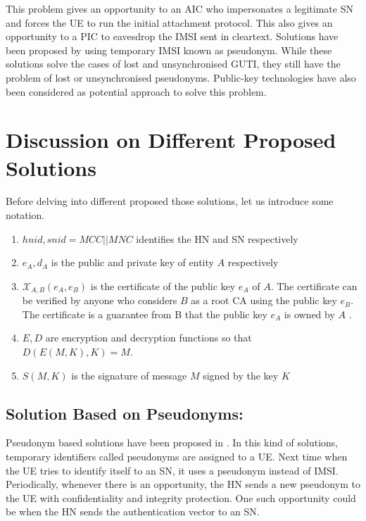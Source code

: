 \documentclass{river-journal}
\begin{document}
This problem gives an opportunity to an AIC who impersonates a legitimate SN and forces the UE to run the initial attachment protocol. This also gives an opportunity to a PIC to eavesdrop the IMSI sent in cleartext. Solutions \cite{pseudonym_valtteri_philip,pseudonym_ericsson,CCS15,SSR15} have been proposed by using temporary IMSI known as pseudonym. While these solutions solve the cases of lost and unsynchronised GUTI, they still have the problem of lost or unsynchronised pseudonyms. Public-key technologies have also been considered as potential approach to solve this problem.

\section{Discussion on Different Proposed Solutions}\label{sec:solutions} 
\label{sec:existing_solutions}
Before delving into different proposed those solutions, let us introduce some notation. 
\begin{enumerate}
\item $hnid,snid=MCC||MNC$ identifies the HN and SN respectively
\item $e_A,d_A$ is the public and private key of entity $A$ respectively
\item $\mathcal{X}_{A,B}(e_A,e_B)$ is the certificate of the public key $e_A$ of $A$. The certificate can be verified by anyone who considers $B$ as a root CA using the public key $e_B$. The certificate is a guarantee from B that the public key $e_A$ is owned by $A$ .
\item $E,D$ are encryption and decryption functions so that $D(E(M,K),K) = M$.
\item $S(M,K)$ is the signature of message $M$ signed by the key $K$
\end{enumerate}

\subsection{Solution Based on Pseudonyms:}
\label{sec:pseudonyms}
Pseudonym based solutions have been proposed in \cite{pseudonym_ericsson,pseudonym_valtteri_philip,CCS15,SSR15}. In this kind of solutions, temporary identifiers called pseudonyms are assigned to a UE. Next time when the UE tries to identify itself to an SN, it uses a pseudonym instead of IMSI. Periodically, whenever there is an opportunity, the HN sends a new pseudonym to the UE with confidentiality and integrity protection. One such opportunity could be when the HN sends the authentication vector to an SN.
\end{document}
